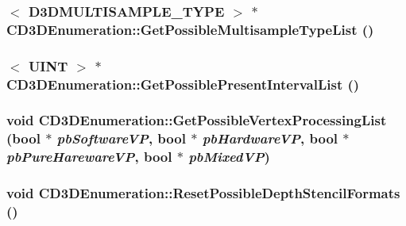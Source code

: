 \label{class_c_d3_d_enumeration_ae09bcb3c67d88efad3a9b01d2608911f}
\hypertarget{class_c_d3_d_enumeration_afc90d28425aa281c45cb07f936e6d14e}{
\subsubsection[{GetPossibleMultisampleTypeList}]{$<$ D3DMULTISAMPLE\_\-TYPE $>$ $\ast$ CD3DEnumeration::GetPossibleMultisampleTypeList ()}}
\label{class_c_d3_d_enumeration_afc90d28425aa281c45cb07f936e6d14e}
\hypertarget{class_c_d3_d_enumeration_aac5d3d7ad9581157f3ac07413f2d6832}{
\subsubsection[{GetPossiblePresentIntervalList}]{$<$ UINT $>$ $\ast$ CD3DEnumeration::GetPossiblePresentIntervalList ()}}
\label{class_c_d3_d_enumeration_aac5d3d7ad9581157f3ac07413f2d6832}
\hypertarget{class_c_d3_d_enumeration_a4b417d97b0d4342f70486e540cb3e910}{
\subsubsection[{GetPossibleVertexProcessingList}]{\setlength{\rightskip}{0pt plus 5cm}void CD3DEnumeration::GetPossibleVertexProcessingList (bool $\ast$ {\em pbSoftwareVP}, \/  bool $\ast$ {\em pbHardwareVP}, \/  bool $\ast$ {\em pbPureHarewareVP}, \/  bool $\ast$ {\em pbMixedVP})}}
\label{class_c_d3_d_enumeration_a4b417d97b0d4342f70486e540cb3e910}
\hypertarget{class_c_d3_d_enumeration_a4129dc6557f638c49f7d33a9b788070f}{
\subsubsection[{ResetPossibleDepthStencilFormats}]{\setlength{\rightskip}{0pt plus 5cm}void CD3DEnumeration::ResetPossibleDepthStencilFormats ()}}
